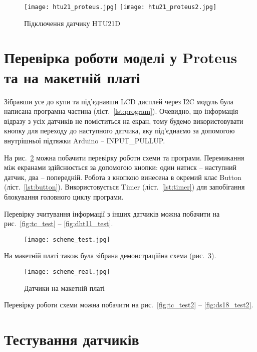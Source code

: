 \begin{figure}[ht]
    \centering
    \texttt{[image: htu21\_proteus.jpg]}
    \texttt{[image: htu21\_proteus2.jpg]}
    \caption{Підключення датчику HTU21D}
    \label{fig:htu21_proteus}
\end{figure}

\section{Перевірка роботи моделі у Proteus та на макетній платі}

Зібравши усе до купи та під'єднавши LCD дисплей через I2C модуль була написана програмна частина (ліст.~\ref{lst:program}). Очевидно, що інформація відразу з усіх датчиків не поміститься на екран, тому будемо використовувати кнопку для переходу до наступного датчика, яку під'єднаємо за допомогою внутрішньої підтяжки Arduino -- INPUT\_PULLUP.

На рис.~\ref{fig:scheme_test} можна побачити перевірку роботи схеми та програми. Перемикання між екранами здійснюється за допомогою кнопки: один натиск -- наступний датчик, два -- попередній. Робота з кнопкою винесена в окремий клас Button (ліст.~\ref{lst:button}). Використовується Timer (ліст.~\ref{lst:timer}) для запобігання блокування головного циклу програми.

Перевірку зчитування інформації з інших датчиків можна побачити на рис.~\ref{fig:tc_test} -- \ref{fig:dht11_test}.

\begin{figure}[ht]
    \centering
    \texttt{[image: scheme\_test.jpg]}
    \caption{}
    \label{fig:scheme_test}
\end{figure}

На макетній платі також була зібрана демонстраційна схема (рис.~\ref{fig:scheme_real}).

\begin{figure}[!hb]
    \centering
    \texttt{[image: scheme\_real.jpg]}
    \caption{Датчики на макетній платі}
    \label{fig:scheme_real}
\end{figure}

Перевірку роботи схеми можна побачити на рис.~\ref{fig:tc_test2} -- \ref{fig:ds18_test2}.\\

\section{Тестування датчиків}

